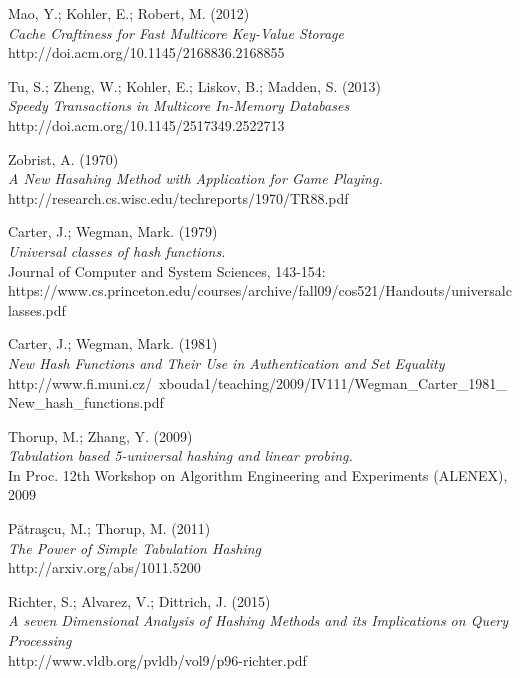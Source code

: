 \documentclass[11pt]{report} %
\begin{document}
\begin{thebibliography}{99}

 Mao, Y.; Kohler, E.; Robert, M. (2012) \\
 \emph{Cache Craftiness for Fast Multicore Key-Value Storage}\\
 http://doi.acm.org/10.1145/2168836.2168855

 Tu, S.; Zheng, W.; Kohler, E.; Liskov, B.; Madden, S. (2013) \\
 \emph{Speedy Transactions in Multicore In-Memory Databases} \\
 http://doi.acm.org/10.1145/2517349.2522713

 Zobrist, A. (1970)\\
 \emph{A New Hasahing Method with Application for Game Playing.}\\
 http://research.cs.wisc.edu/techreports/1970/TR88.pdf

 Carter, J.; Wegman, Mark. (1979)\\
 \emph{Universal classes of hash functions.}\\
 Journal of Computer and System Sciences, 143-154:\\
 https://www.cs.princeton.edu/courses/archive/fall09/cos521/Handouts/universalclasses.pdf

 Carter, J.; Wegman, Mark. (1981)\\
 \emph{New Hash Functions and Their Use in Authentication and Set Equality}
 http://www.fi.muni.cz/~xbouda1/teaching/2009/IV111/Wegman\_Carter\_1981\_New\_hash\_functions.pdf

 Thorup, M.; Zhang, Y. (2009)\\
 \emph{Tabulation based 5-universal hashing and linear probing.}\\
 In Proc. 12th Workshop on Algorithm Engineering and Experiments (ALENEX), 2009

 Pătraşcu, M.; Thorup, M. (2011)\\
 \emph{The Power of Simple Tabulation Hashing}\\
 http://arxiv.org/abs/1011.5200

 Richter, S.; Alvarez, V.; Dittrich, J. (2015)\\
 \emph{A seven Dimensional Analysis of Hashing Methods and its Implications on Query Processing}\\
 http://www.vldb.org/pvldb/vol9/p96-richter.pdf


\end{thebibliography}
\end{document}
